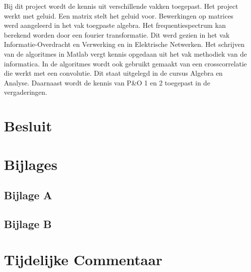 \documentclass[12pt]{report}
\begin{document}
Bij dit project wordt de kennis uit verschillende vakken toegepast. Het project werkt met geluid. Een matrix stelt het geluid voor. Bewerkingen op matrices werd aangeleerd in het vak toegpaste algebra. Het frequentiespectrum kan berekend worden door een fourier transformatie. Dit werd gezien in het vak Informatie-Overdracht en Verwerking en in Elektrische Netwerken. Het schrijven van de algoritmes in Matlab vergt kennis opgedaan uit het vak methodiek van de informatica. In de algoritmes wordt ook gebruikt gemaakt van een crosscorrelatie die werkt met een convolutie. Dit staat uitgelegd in de cursus Algebra en Analyse. Daarnaast wordt de kennis van P&O 1 en 2 toegepast in de vergaderingen. 

\chapter*{Besluit}







\chapter*{Bijlages}
\section{Bijlage A}
\label{sec:bijlageA}

\section{Bijlage B}




\chapter{Tijdelijke Commentaar}
\end{document}

